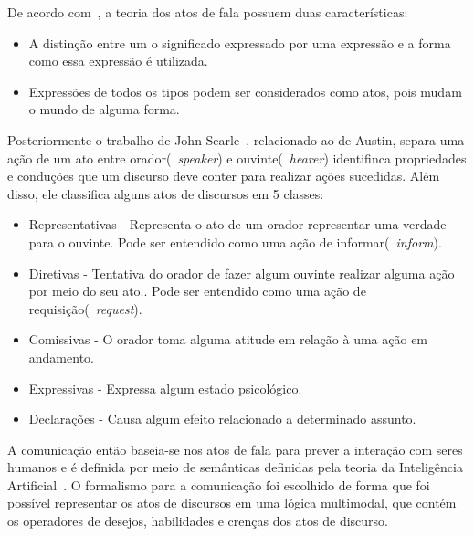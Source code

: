 De acordo com~\cite{verschueren09}, a teoria dos atos de fala possuem duas características:
\begin{itemize}
	\item A distinção entre um o significado expressado por uma expressão e a forma como essa expressão é utilizada.
	\item Expressões de todos os tipos podem ser considerados como atos, pois mudam o mundo de alguma forma.
\end{itemize}

Posteriormente o trabalho de John Searle~\cite{searle69}, relacionado ao de Austin, separa uma ação de um ato entre orador(~\emph{speaker}) e ouvinte(~\emph{hearer}) identifinca propriedades e conduções que um discurso deve conter para realizar ações sucedidas. Além disso, ele classifica alguns atos de discursos em 5 classes:
\begin{itemize}
	\item Representativas - Representa o ato de um orador representar uma verdade para o ouvinte. Pode ser entendido como uma ação de informar(~\emph{inform}).
	\item Diretivas - Tentativa do orador de fazer algum ouvinte realizar alguma ação por meio do seu ato.. Pode ser entendido como uma ação de requisição(~\emph{request}).
	\item Comissivas - O orador toma alguma atitude em relação à uma ação em andamento.
	\item Expressivas - Expressa algum estado psicológico.
	\item Declarações - Causa algum efeito relacionado a determinado assunto.
\end{itemize}

A comunicação então baseia-se nos atos de fala para prever a interação com seres humanos e é definida por meio de semânticas definidas pela teoria da Inteligência Artificial~\cite{wooldridge04}. O formalismo para a comunicação foi escolhido de forma que foi possível representar os atos de discursos em uma lógica multimodal, que contém os operadores de desejos, habilidades e crenças dos atos de discurso.


